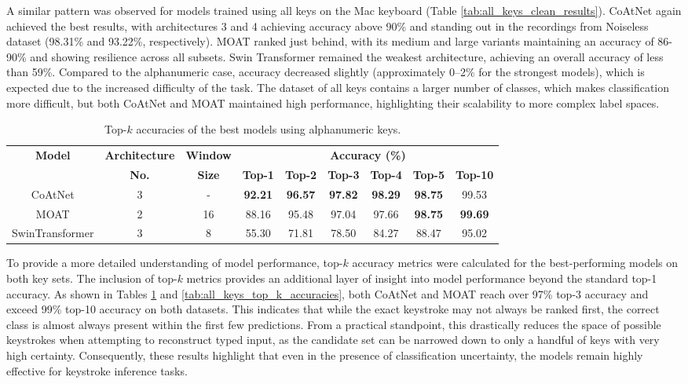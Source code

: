 \documentclass[a4paper,11pt,twoside]{report}
\theoremstyle{definition}
\begin{document}
A similar pattern was observed for models trained using all keys on the Mac keyboard (Table \ref{tab:all_keys_clean_results}). CoAtNet again achieved the best results, with architectures 3 and 4 achieving accuracy above 90\% and standing out in the recordings from Noiseless dataset (98.31\% and 93.22\%, respectively). MOAT ranked just behind, with its medium and large variants maintaining an accuracy of 86-90\% and showing resilience across all subsets. Swin Transformer remained the weakest architecture, achieving an overall accuracy of less than 59\%. Compared to the alphanumeric case, accuracy decreased slightly (approximately 0–2\% for the strongest models), which is expected due to the increased difficulty of the task. The dataset of all keys contains a larger number of classes, which makes classification more difficult, but both CoAtNet and MOAT maintained high performance, highlighting their scalability to more complex label spaces.


\begin{table}[h!]
\centering
\caption{Top-$k$ accuracies of the best models using alphanumeric keys.}
\begin{adjustbox}{max width=\textwidth}
\begin{tabular}{c|c|c|cccccc}
\hline
\textbf{Model} & \textbf{Architecture} & \textbf{Window} & \multicolumn{6}{c}{\textbf{Accuracy (\%)}} \\
\cline{4-9}
 & \textbf{No.} & \textbf{Size} & \textbf{Top-1} & \textbf{Top-2} & \textbf{Top-3} & \textbf{Top-4} & \textbf{Top-5} & \textbf{Top-10} \\
\hline
CoAtNet & 3 & - & \textbf{92.21} & \textbf{96.57} & \textbf{97.82} & \textbf{98.29} & \textbf{98.75} & 99.53 \\
MOAT & 2 & 16 & 88.16 & 95.48 & 97.04 & 97.66 & \textbf{98.75} & \textbf{99.69} \\
SwinTransformer & 3 & 8 & 55.30 & 71.81 & 78.50 & 84.27 & 88.47 & 95.02 \\
\hline
\end{tabular}
\end{adjustbox}
\label{tab:alphanumeric_top_k_accuracies}
\end{table}

To provide a more detailed understanding of model performance, top-$k$ accuracy metrics were calculated for the best-performing models on both key sets. The inclusion of top-$k$ metrics provides an additional layer of insight into model performance beyond the standard top-1 accuracy. As shown in Tables \ref{tab:alphanumeric_top_k_accuracies} and \ref{tab:all_keys_top_k_accuracies}, both CoAtNet and MOAT reach over 97\% top-3 accuracy and exceed 99\% top-10 accuracy on both datasets. This indicates that while the exact keystroke may not always be ranked first, the correct class is almost always present within the first few predictions. From a practical standpoint, this drastically reduces the space of possible keystrokes when attempting to reconstruct typed input, as the candidate set can be narrowed down to only a handful of keys with very high certainty. Consequently, these results highlight that even in the presence of classification uncertainty, the models remain highly effective for keystroke inference tasks.
\end{document}
